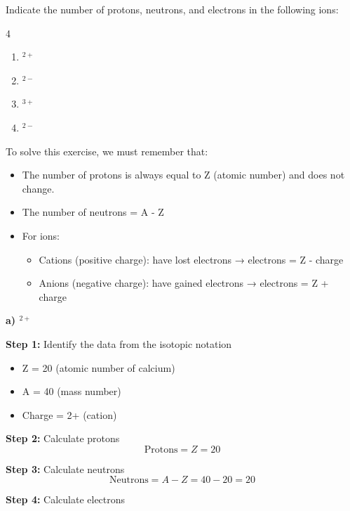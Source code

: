 \begin{exercise}
    Indicate the number of protons, neutrons, and electrons in the following ions:
    \begin{multicols}{4}
        \begin{enumerate}[label=\letraminuscula]
        \item {}$^{2+}$
        \item {}$^{2-}$
        \item {}$^{3+}$
        \item {}$^{2-}$
        \end{enumerate}
    \end{multicols}
    \begin{solu}
        To solve this exercise, we must remember that:
        \begin{itemize}
            \item The number of protons is always equal to Z (atomic number) and does not change.
            \item The number of neutrons = A - Z
            \item For ions:
            \begin{itemize}
                \item Cations (positive charge): have lost electrons → electrons = Z - charge
                \item Anions (negative charge): have gained electrons → electrons = Z + charge
            \end{itemize}
        \end{itemize}

        \textbf{a) $^{2+}$}

        \textbf{Step 1:} Identify the data from the isotopic notation
        \begin{itemize}
            \item Z = 20 (atomic number of calcium)
            \item A = 40 (mass number)
            \item Charge = 2+ (cation)
        \end{itemize}

        \textbf{Step 2:} Calculate protons
        \[
            \text{Protons} = Z = 20
        \]

        \textbf{Step 3:} Calculate neutrons
        \[
            \text{Neutrons} = A - Z = 40 - 20 = 20
        \]

        \textbf{Step 4:} Calculate electrons


\end{solu}
\end{exercise}
